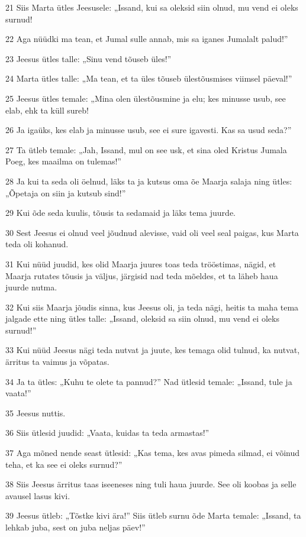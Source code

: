 \par 21 Siis Marta ütles Jeesusele: „Issand, kui sa oleksid siin olnud, mu vend ei oleks surnud!
\par 22 Aga nüüdki ma tean, et Jumal sulle annab, mis sa iganes Jumalalt palud!”
\par 23 Jeesus ütles talle: „Sinu vend tõuseb üles!”
\par 24 Marta ütles talle: „Ma tean, et ta üles tõuseb ülestõusmises viimsel päeval!”
\par 25 Jeesus ütles temale: „Mina olen ülestõusmine ja elu; kes minusse usub, see elab, ehk ta küll sureb!
\par 26 Ja igaüks, kes elab ja minusse usub, see ei sure igavesti. Kas sa usud seda?”
\par 27 Ta ütleb temale: „Jah, Issand, mul on see usk, et sina oled Kristus Jumala Poeg, kes maailma on tulemas!”
\par 28 Ja kui ta seda oli öelnud, läks ta ja kutsus oma õe Maarja salaja ning ütles: „Õpetaja on siin ja kutsub sind!”
\par 29 Kui õde seda kuulis, tõusis ta sedamaid ja läks tema juurde.
\par 30 Sest Jeesus ei olnud veel jõudnud alevisse, vaid oli veel seal paigas, kus Marta teda oli kohanud.
\par 31 Kui nüüd juudid, kes olid Maarja juures toas teda trööstimas, nägid, et Maarja rutates tõusis ja väljus, järgisid nad teda mõeldes, et ta läheb haua juurde nutma.
\par 32 Kui siis Maarja jõudis sinna, kus Jeesus oli, ja teda nägi, heitis ta maha tema jalgade ette ning ütles talle: „Issand, oleksid sa siin olnud, mu vend ei oleks surnud!”
\par 33 Kui nüüd Jeesus nägi teda nutvat ja juute, kes temaga olid tulnud, ka nutvat, ärritus ta vaimus ja võpatas.
\par 34 Ja ta ütles: „Kuhu te olete ta pannud?” Nad ütlesid temale: „Issand, tule ja vaata!”
\par 35 Jeesus nuttis.
\par 36 Siis ütlesid juudid: „Vaata, kuidas ta teda armastas!”
\par 37 Aga mõned nende seast ütlesid: „Kas tema, kes avas pimeda silmad, ei võinud teha, et ka see ei oleks surnud?”
\par 38 Siis Jeesus ärritus taas iseeneses ning tuli haua juurde. See oli koobas ja selle avausel lasus kivi.
\par 39 Jeesus ütleb: „Tõstke kivi ära!” Siis ütleb surnu õde Marta temale: „Issand, ta lehkab juba, sest on juba neljas päev!”
